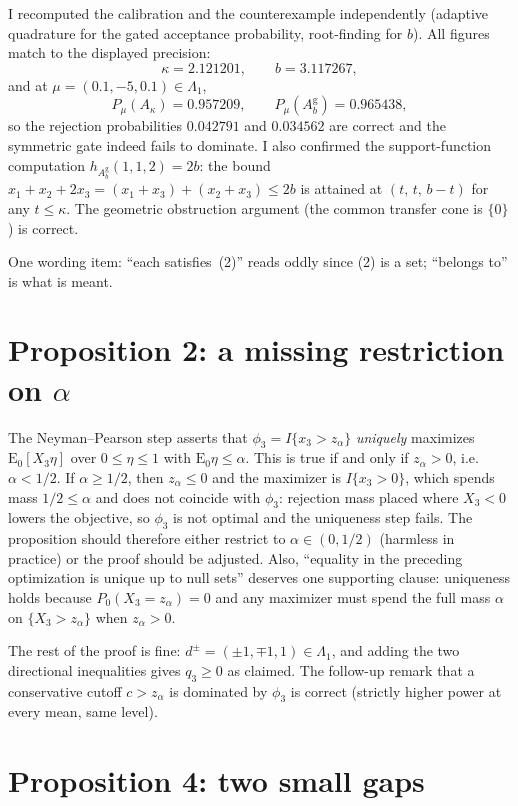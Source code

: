 \documentclass[12pt]{article}
\newcommand{\E}{\mathrm{E}}
\begin{document}
I recomputed the calibration and the counterexample independently
(adaptive quadrature for the gated acceptance probability, root-finding
for $b$). All figures match to the displayed precision:
\[
\kappa=2.121201,\qquad b=3.117267,
\]
and at $\mu=(0.1,-5,0.1)\in\Lambda_1$,
\[
P_\mu(A_\kappa)=0.957209,\qquad
P_\mu(A_b^{\mathrm g})=0.965438,
\]
so the rejection probabilities $0.042791$ and $0.034562$ are correct and
the symmetric gate indeed fails to dominate. I also confirmed the
support-function computation $h_{A_b^{\mathrm g}}(1,1,2)=2b$: the bound
$x_1+x_2+2x_3=(x_1+x_3)+(x_2+x_3)\le2b$ is attained at
$(t,\,t,\,b-t)$ for any $t\le\kappa$. The geometric obstruction
argument (the common transfer cone is $\{0\}$) is correct.

One wording item: ``each satisfies~(2)'' reads oddly since (2) is a set;
``belongs to'' is what is meant.

\section{Proposition 2: a missing restriction on $\alpha$}

The Neyman--Pearson step asserts that $\phi_3=I\{x_3>z_\alpha\}$
\emph{uniquely} maximizes $\E_0[X_3\eta]$ over $0\le\eta\le1$ with
$\E_0\eta\le\alpha$. This is true if and only if $z_\alpha>0$, i.e.\
$\alpha<1/2$. If $\alpha\ge1/2$, then $z_\alpha\le0$ and the maximizer is
$I\{x_3>0\}$, which spends mass $1/2\le\alpha$ and does not coincide
with $\phi_3$: rejection mass placed where $X_3<0$ lowers the
objective, so $\phi_3$ is not optimal and the uniqueness step fails. The proposition should
therefore either restrict to $\alpha\in(0,1/2)$ (harmless in practice)
or the proof should be adjusted. Also, ``equality in the preceding
optimization is unique up to null sets'' deserves one supporting clause:
uniqueness holds because $P_0(X_3=z_\alpha)=0$ and any maximizer must
spend the full mass $\alpha$ on $\{X_3>z_\alpha\}$ when $z_\alpha>0$.

The rest of the proof is fine: $d^\pm=(\pm1,\mp1,1)\in\Lambda_1$, and
adding the two directional inequalities gives $q_3\ge0$ as claimed. The
follow-up remark that a conservative cutoff $c>z_\alpha$ is dominated by
$\phi_3$ is correct (strictly higher power at every mean, same level).

\section{Proposition 4: two small gaps}
\end{document}
